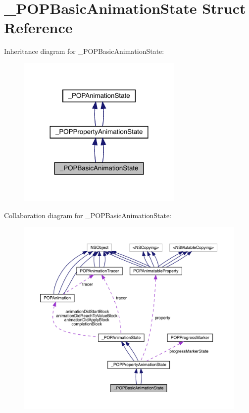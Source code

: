 \hypertarget{struct___p_o_p_basic_animation_state}{}\section{\+\_\+\+P\+O\+P\+Basic\+Animation\+State Struct Reference}
\label{struct___p_o_p_basic_animation_state}


Inheritance diagram for \+\_\+\+P\+O\+P\+Basic\+Animation\+State\+:\nopagebreak
\begin{figure}[H]
\begin{center}
\leavevmode
\includegraphics[width=228pt]{struct___p_o_p_basic_animation_state__inherit__graph}
\end{center}
\end{figure}


Collaboration diagram for \+\_\+\+P\+O\+P\+Basic\+Animation\+State\+:\nopagebreak
\begin{figure}[H]
\begin{center}
\leavevmode
\includegraphics[width=350pt]{struct___p_o_p_basic_animation_state__coll__graph}
\end{center}
\end{figure}
